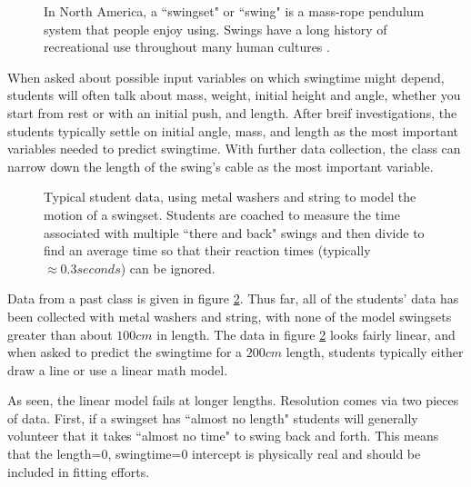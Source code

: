 \documentclass[12pt]{iopart}
\begin{document}
\begin{figure}[h]
\centering
\caption{
In North America, a ``swingset" or ``swing" is a mass-rope pendulum system that people enjoy using.
        Swings have a long history of recreational use throughout many human cultures \cite{swings-wikipedia}.
}
\label{buffet}
\end{figure}

When asked about possible input variables on which swingtime might depend, students will often talk about mass, weight, initial height and angle, whether you start from rest or with an initial push, and length.  
After breif investigations, the students typically settle on initial angle, mass, and length as the most important variables needed to predict swingtime.  
With further data collection, the class can narrow down the length of the swing's cable as the most important variable.  

\begin{figure}[h]
\centering
\caption{
Typical student data, using metal washers and string to model the motion of a swingset.
        Students are coached to measure the time associated with multiple ``there and back" swings and then divide to find an average time so that their reaction times (typically $\approx0.3 seconds$) can be ignored.
        }
        \label{swingtime_graph}
\end{figure}

Data from a past class is given in figure \ref{swingtime_graph}. Thus far, all of the students' data has been collected with metal washers and string, with none of the model swingsets greater than about $100cm$ in length. The data in figure \ref{swingtime_graph} looks fairly linear, and when asked  to predict the swingtime for a $200cm$ length, students typically either draw a line or use a linear math model.  

As seen, the linear model fails at longer lengths. Resolution comes via two pieces of data.  First, if a swingset has ``almost no length" students will generally volunteer that it takes ``almost no time" to swing back and forth.  This means that the length=0, swingtime=0 intercept is physically real and should be included in fitting efforts.  
\end{document}
